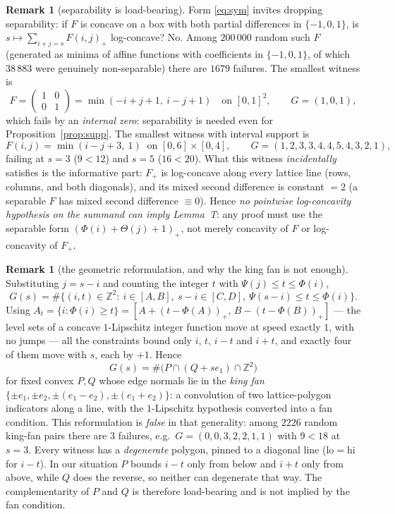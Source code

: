 \documentclass[11pt]{article}
\theoremstyle{definition}
\newtheorem{remark}[theorem]{Remark}
\newcommand{\Z}{\mathbb{Z}}
\begin{document}
\begin{remark}[separability is load-bearing]\label{rem:tgen}
Form \eqref{eq:sym} invites dropping separability: if $F$ is concave on a box with both
partial differences in $\{-1,0,1\}$, is $s\mapsto\sum_{i+j=s}F(i,j)_+$ log-concave? No.
Among $200\,000$ random such $F$ (generated as minima of affine functions with
coefficients in $\{-1,0,1\}$, of which $38\,883$ were genuinely non-separable) there are
$1679$ failures. The smallest witness is
\[
  F=\begin{pmatrix}1&0\\0&1\end{pmatrix}=\min(-i+j+1,\ i-j+1)
  \quad\text{on } [0,1]^2,\qquad G=(1,0,1),
\]
which fails by an \emph{internal zero}: separability is needed even for
Proposition~\ref{prop:supp}. The smallest witness with interval support is
\[
  F(i,j)=\min(i-j+3,\ 1)\ \text{ on }[0,6]\times[0,4],\qquad
  G=(1,2,3,3,4,4,5,4,3,2,1),
\]
failing at $s=3$ ($9<12$) and $s=5$ ($16<20$). What this witness \emph{incidentally}
satisfies is the informative part: $F_+$ is log-concave along every lattice line (rows,
columns, and both diagonals), and its mixed second difference is constant $=2$ (a
separable $F$ has mixed second difference $\equiv0$). Hence \emph{no pointwise
log-concavity hypothesis on the summand can imply Lemma~T}: any proof must use the
separable form $(\Phi(i)+\Theta(j)+1)_+$, not merely concavity of $F$ or log-concavity
of $F_+$.
\end{remark}

\begin{remark}[the geometric reformulation, and why the king fan is not enough]
Substituting $j=s-i$ and counting the integer $t$ with $\Psi(j)\le t\le\Phi(i)$,
\[
  G(s)=\#\bigl\{(i,t)\in\Z^2:\ i\in[A,B],\ s-i\in[C,D],\ \Psi(s-i)\le t\le\Phi(i)\bigr\}.
\]
Using $A_t=\{i:\Phi(i)\ge t\}=[A+(t-\Phi(A))_+,\,B-(t-\Phi(B))_+]$ --- the level sets of
a concave $1$-Lipschitz integer function move at speed exactly $1$, with no jumps --- all
the constraints bound only $i$, $t$, $i-t$ and $i+t$, and exactly four of them move with
$s$, each by $+1$. Hence
\[
  G(s)=\#\bigl(P\cap(Q+s e_1)\cap\Z^2\bigr)
\]
for fixed convex $P,Q$ whose edge normals lie in the \emph{king fan}
$\{\pm e_1,\pm e_2,\pm(e_1-e_2),\pm(e_1+e_2)\}$: a convolution of two lattice-polygon
indicators along a line, with the $1$-Lipschitz hypothesis converted into a fan
condition. This reformulation is \emph{false} in that generality: among $2226$ random
king-fan pairs there are $3$ failures, e.g.\ $G=(0,0,3,2,2,1,1)$ with $9<18$ at $s=3$.
Every witness has a \emph{degenerate} polygon, pinned to a diagonal line
($\mathrm{lo}=\mathrm{hi}$ for $i-t$). In our situation $P$ bounds $i-t$ only from below
and $i+t$ only from above, while $Q$ does the reverse, so neither can degenerate that
way. The complementarity of $P$ and $Q$ is therefore load-bearing and is not implied by
the fan condition.
\end{remark}
\end{document}
